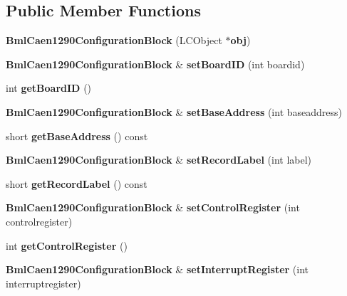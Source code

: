 \subsection*{Public Member Functions}
\begin{DoxyCompactItemize}
\item 
{\bfseries Bml\-Caen1290\-Configuration\-Block} (L\-C\-Object $\ast${\bf obj})\label{classCALICE_1_1BmlCaen1290ConfigurationBlock_a2d4ea6c8b939a48a1236a7d38087a469}

\item 
{\bf Bml\-Caen1290\-Configuration\-Block} \& {\bfseries set\-Board\-I\-D} (int boardid)\label{classCALICE_1_1BmlCaen1290ConfigurationBlock_a26eb94a1bcb0960c8c36a8183e88fb7b}

\item 
int {\bfseries get\-Board\-I\-D} ()\label{classCALICE_1_1BmlCaen1290ConfigurationBlock_a7388b9a32d541f9f810e618e4e0090a6}

\item 
{\bf Bml\-Caen1290\-Configuration\-Block} \& {\bfseries set\-Base\-Address} (int baseaddress)\label{classCALICE_1_1BmlCaen1290ConfigurationBlock_a91ac6d8a2c5ed25692fd031b032286d8}

\item 
short {\bfseries get\-Base\-Address} () const \label{classCALICE_1_1BmlCaen1290ConfigurationBlock_aa3350ed9c44286ce22dadefa15a3f2b9}

\item 
{\bf Bml\-Caen1290\-Configuration\-Block} \& {\bfseries set\-Record\-Label} (int label)\label{classCALICE_1_1BmlCaen1290ConfigurationBlock_aa352775bfd0fefd8f159007a848680c7}

\item 
short {\bfseries get\-Record\-Label} () const \label{classCALICE_1_1BmlCaen1290ConfigurationBlock_aba8ba99a96410f121cbfe9ae0a0712c6}

\item 
{\bf Bml\-Caen1290\-Configuration\-Block} \& {\bfseries set\-Control\-Register} (int controlregister)\label{classCALICE_1_1BmlCaen1290ConfigurationBlock_aac6dd9b7a93bbe7018580d7ed2541994}

\item 
int {\bfseries get\-Control\-Register} ()\label{classCALICE_1_1BmlCaen1290ConfigurationBlock_a44e50c75db94105d7a558450b99b2d5a}

\item 
{\bf Bml\-Caen1290\-Configuration\-Block} \& {\bfseries set\-Interrupt\-Register} (int interruptregister)\label{classCALICE_1_1BmlCaen1290ConfigurationBlock_a81599fbfb68917487f0c62b74022fd11}


\end{DoxyCompactItemize}
